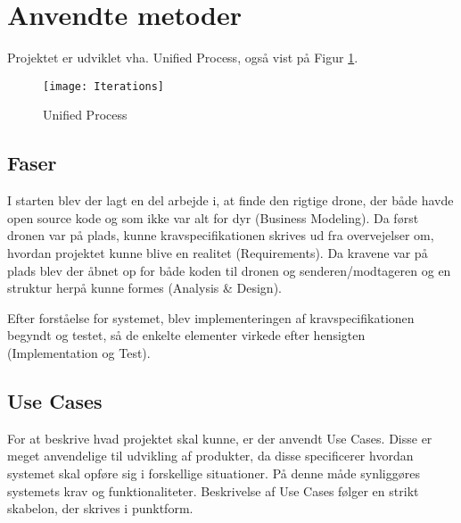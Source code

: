 \documentclass[Main]{subfiles}
\begin{document}
\section{Anvendte metoder}

Projektet er udviklet vha. Unified Process\cite{Larman}, også vist på Figur \ref{Fig:UP}.

\begin{figure}[H]
\centering
\texttt{[image: Iterations]}
\caption{Unified Process}
\label{Fig:UP}
\end{figure}



\subsection{Faser}
I starten blev der lagt en del arbejde i, at finde den rigtige drone, der både havde open source kode og som ikke var alt for dyr (Business Modeling).
Da først dronen var på plads, kunne kravspecifikationen\cite{Kravspec} skrives ud fra overvejelser om, hvordan projektet kunne blive en realitet (Requirements).
Da kravene var på plads blev der åbnet op for både koden til dronen og senderen/modtageren og en struktur herpå kunne formes (Analysis \& Design).

Efter forståelse for systemet, blev implementeringen af kravspecifikationen begyndt og testet, så de enkelte elementer virkede efter hensigten (Implementation og Test).





\subsection{Use Cases}
For at beskrive hvad projektet skal kunne, er der anvendt Use Cases.
Disse er meget anvendelige til udvikling af produkter, da disse specificerer hvordan systemet skal opføre sig i forskellige situationer.
På denne måde synliggøres systemets krav og funktionaliteter.
Beskrivelse af Use Cases følger en strikt skabelon, der skrives i punktform.
\end{document}
